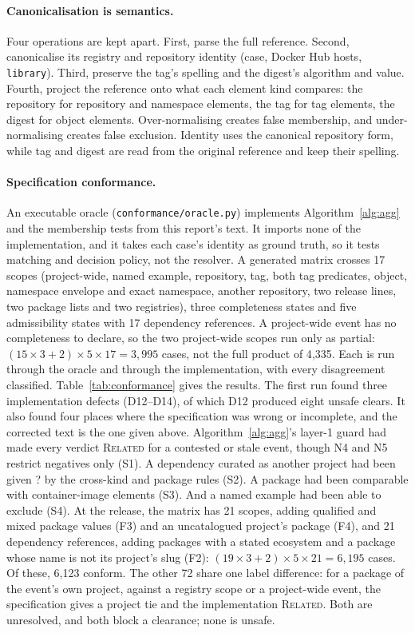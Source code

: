 \documentclass[11pt,a4paper]{article}
\newcommand{\code}[1]{\texttt{#1}}
\newcommand{\Ind}{\textsf{?}}
\begin{document}
\paragraph{Canonicalisation is semantics.} Four operations are kept
apart. First, parse the full reference. Second, canonicalise its
registry and repository identity (case, Docker Hub hosts,
\code{library}). Third, preserve the tag's spelling and the digest's
algorithm and value. Fourth, project the reference onto what each
element kind compares: the repository for repository and namespace
elements, the tag for tag elements, the digest for object elements.
Over-normalising creates false membership, and under-normalising
creates false exclusion. Identity uses the canonical
repository form, while tag and digest are read from the original
reference and keep their spelling.

\paragraph{Specification conformance.} An executable oracle
(\code{conformance/oracle.py}) implements Algorithm~\ref{alg:agg} and
the membership tests from this report's text. It imports none of the
implementation, and it takes each case's identity as ground truth, so
it tests matching and decision policy, not the resolver. A generated
matrix crosses 17 scopes (project-wide, named example, repository, tag,
both tag predicates, object, namespace envelope and exact namespace,
another repository, two release lines, two package lists and two
registries), three completeness states and five admissibility states
with 17 dependency references. A project-wide event has no
completeness to declare, so the two project-wide scopes run only as
partial: $(15 \times 3 + 2) \times 5 \times 17 = 3{,}995$ cases, not
the full product of 4{,}335. Each is run
through the oracle and through the implementation, with every
disagreement classified. Table~\ref{tab:conformance} gives the
results. The first run found three implementation defects (D12--D14),
of which D12 produced eight unsafe clears. It also found four places
where the specification was wrong or incomplete, and the corrected
text is the one given above. Algorithm~\ref{alg:agg}'s layer-1 guard had made every
verdict \textsc{Related} for a contested or stale event, though N4
and N5 restrict negatives only (S1). A dependency curated as another
project had been given \Ind{} by the cross-kind and package rules (S2).
A package had been comparable with container-image elements (S3). And
a named example had been able to exclude (S4).
At the release, the matrix has 21 scopes, adding qualified and
mixed package values (F3) and an uncatalogued project's package (F4),
and 21 dependency references, adding packages with a stated ecosystem
and a package whose name is not its project's slug (F2): $(19 \times
3 + 2) \times 5 \times 21 = 6{,}195$ cases. Of these, 6{,}123 conform.
The other 72 share one label difference: for a package of the event's
own project, against a registry scope or a project-wide event, the
specification gives a project tie and the implementation
\textsc{Related}. Both are unresolved, and both block a clearance;
none is unsafe.
\end{document}
